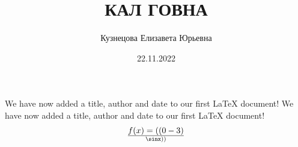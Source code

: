 \documentclass[12pt, letterpaper, twoside]{article}
\title{КАЛ ГОВНА}
\author{Кузнецова Елизавета Юрьевна}
\date{22.11.2022}
\begin{document}
\maketitle
\newpage
We have now added a title, author and date to our first \LaTeX{} document!
We have now added a title, author and date to our first \LaTeX{} document!
\[f(x) =((0 - 3) \over\sinx))\]
\end{document}
